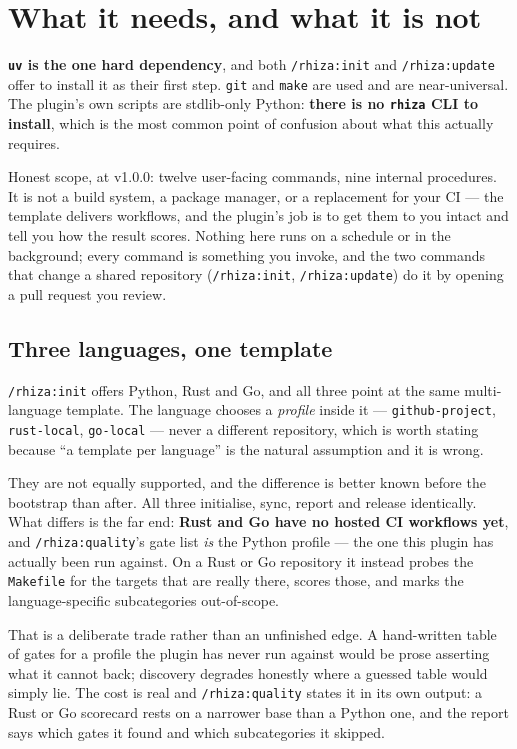 \documentclass[11pt,a4paper]{article}
\newcommand{\cmd}[1]{\texttt{/rhiza:#1}}
\newcommand{\file}[1]{\texttt{#1}}
\begin{document}
\section{What it needs, and what it is not}
\label{sec:requirements}

\textbf{\texttt{uv} is the one hard dependency}, and both \cmd{init} and \cmd{update}
offer to install it as their first step. \texttt{git} and \texttt{make} are used and are
near-universal. The plugin's own scripts are stdlib-only Python: \textbf{there is no
\texttt{rhiza} CLI to install}, which is the most common point of confusion about what
this actually requires.

Honest scope, at v1.0.0: twelve user-facing commands, nine internal procedures. It is
not a build system, a package manager, or a replacement for your CI --- the template
delivers workflows, and the plugin's job is to get them to you intact and tell you how
the result scores. Nothing here runs on a schedule or in the background; every command
is something you invoke, and the two commands that change a shared repository
(\cmd{init}, \cmd{update}) do it by opening a pull request you review.

\subsection*{Three languages, one template}
\label{sec:languages}

\cmd{init} offers Python, Rust and Go, and all three point at the same multi-language
template. The language chooses a \emph{profile} inside it --- \texttt{github-project},
\texttt{rust-local}, \texttt{go-local} --- never a different repository, which is worth
stating because ``a template per language'' is the natural assumption and it is wrong.

They are not equally supported, and the difference is better known before the bootstrap
than after. All three initialise, sync, report and release identically. What differs is
the far end: \textbf{Rust and Go have no hosted CI workflows yet}, and \cmd{quality}'s
gate list \emph{is} the Python profile --- the one this plugin has actually been run
against. On a Rust or Go repository it instead probes the \file{Makefile} for the targets
that are really there, scores those, and marks the language-specific subcategories
out-of-scope.

That is a deliberate trade rather than an unfinished edge. A hand-written table of gates
for a profile the plugin has never run against would be prose asserting what it cannot
back; discovery degrades honestly where a guessed table would simply lie. The cost is
real and \cmd{quality} states it in its own output: a Rust or Go scorecard rests on a
narrower base than a Python one, and the report says which gates it found and which
subcategories it skipped.
\end{document}
